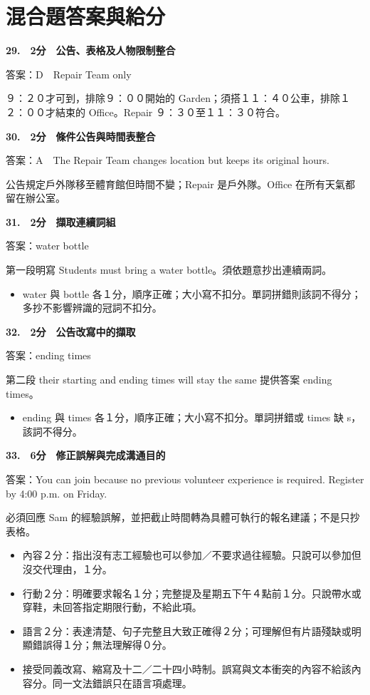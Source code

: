 \documentclass[11pt,a4paper]{article}
\begin{document}
\newpage
\section*{混合題答案與給分}
\textbf{29.　2分　公告、表格及人物限制整合}\par
答案：D　Repair Team only
\par\smallskip
９：２０才可到，排除９：００開始的 Garden；須搭１１：４０公車，排除１２：００才結束的 Office。Repair ９：３０至１１：３０符合。
\par\smallskip
\medskip
{}\textbf{30.　2分　條件公告與時間表整合}\par
答案：A　The Repair Team changes location but keeps its original hours.
\par\smallskip
公告規定戶外隊移至體育館但時間不變；Repair 是戶外隊。Office 在所有天氣都留在辦公室。
\par\smallskip
\medskip
{}\textbf{31.　2分　擷取連續詞組}\par
答案：water bottle
\par\smallskip
第一段明寫 Students must bring a water bottle。須依題意抄出連續兩詞。
\par\smallskip
\begin{itemize}[leftmargin=1.3em,itemsep=2pt,topsep=1pt]
\item water 與 bottle 各１分，順序正確；大小寫不扣分。單詞拼錯則該詞不得分；多抄不影響辨識的冠詞不扣分。
\end{itemize}
\medskip
{}\textbf{32.　2分　公告改寫中的擷取}\par
答案：ending times
\par\smallskip
第二段 their starting and ending times will stay the same 提供答案 ending times。
\par\smallskip
\begin{itemize}[leftmargin=1.3em,itemsep=2pt,topsep=1pt]
\item ending 與 times 各１分，順序正確；大小寫不扣分。單詞拼錯或 times 缺 s，該詞不得分。
\end{itemize}
\medskip
{}\textbf{33.　6分　修正誤解與完成溝通目的}\par
答案：You can join because no previous volunteer experience is required. Register by 4:00 p.m. on Friday.
\par\smallskip
必須回應 Sam 的經驗誤解，並把截止時間轉為具體可執行的報名建議；不是只抄表格。
\par\smallskip
\begin{itemize}[leftmargin=1.3em,itemsep=2pt,topsep=1pt]
\item 內容２分：指出沒有志工經驗也可以參加／不要求過往經驗。只說可以參加但沒交代理由，１分。
\item 行動２分：明確要求報名１分；完整提及星期五下午４點前１分。只說帶水或穿鞋，未回答指定期限行動，不給此項。
\item 語言２分：表達清楚、句子完整且大致正確得２分；可理解但有片語殘缺或明顯錯誤得１分；無法理解得０分。
\item 接受同義改寫、縮寫及十二／二十四小時制。誤寫與文本衝突的內容不給該內容分。同一文法錯誤只在語言項處理。
\end{itemize}
\medskip
\end{document}
